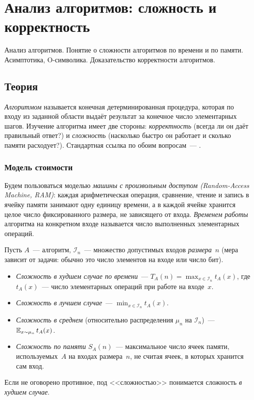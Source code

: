 
\section{Анализ алгоритмов: сложность и корректность}
\label{sec:1.3.01-complexity-correctness}

\begin{ticket}
Анализ алгоритмов. Понятие о сложности алгоритмов по времени и по памяти. Асимптотика, O-символика. Доказательство корректности алгоритмов.
\end{ticket}

\subsection*{Теория}

\emph{Алгоритмом} называется конечная детерминированная процедура,
которая по входу из заданной области выдаёт результат за конечное
число элементарных шагов. Изучение алгоритма имеет две стороны:
\emph{корректность} (всегда ли он даёт правильный ответ?) и
\emph{сложность} (насколько быстро он работает и сколько памяти
расходует?). Стандартная ссылка по обоим вопросам~--- \cite{CLRS2013}.

\subsubsection*{Модель стоимости}

Будем пользоваться моделью \emph{машины с произвольным доступом
(Random-Access Machine, RAM)}: каждая арифметическая операция,
сравнение, чтение и запись в ячейку памяти занимают одну единицу
времени, а в каждой ячейке хранится целое число фиксированного
размера, не зависящего от входа. \emph{Временем работы} алгоритма на
конкретном входе называется число выполненных элементарных операций.

\begin{definition}
\label{def:complexity}
Пусть $A$~--- алгоритм, $\mathcal{I}_n$~--- множество допустимых
входов \emph{размера}~$n$ (мера зависит от задачи: обычно это число
элементов на входе или число бит).
\begin{itemize}
  \item \emph{Сложность в худшем случае по времени}~---
        $T_A(n) = \max_{x \in \mathcal{I}_n} t_A(x)$,
        где $t_A(x)$~--- число элементарных операций при работе на
        входе~$x$.
  \item \emph{Сложность в лучшем случае}~---
        $\min_{x \in \mathcal{I}_n} t_A(x)$.
  \item \emph{Сложность в среднем} (относительно распределения
        $\mu_n$ на $\mathcal{I}_n$)~---
        $\mathbb{E}_{x \sim \mu_n}\, t_A(x)$.
  \item \emph{Сложность по памяти} $S_A(n)$~--- максимальное число
        ячеек памяти, используемых~$A$ на входах размера~$n$, не
        считая ячеек, в которых хранится сам вход.
\end{itemize}
Если не оговорено противное, под <<сложностью>> понимается сложность
\emph{в худшем случае}.
\end{definition}

